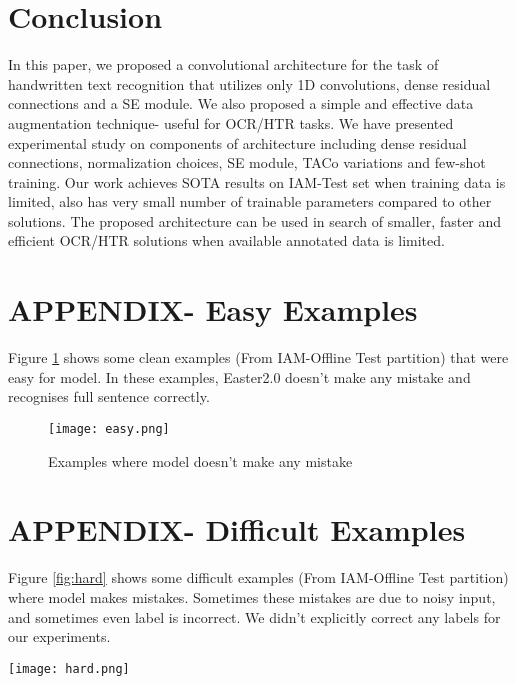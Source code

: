 \documentclass{article}
\begin{document}
\section{Conclusion}
In this paper, we proposed a convolutional architecture for the task of handwritten text recognition that utilizes only 1D convolutions, dense residual connections and a SE module. We also proposed a simple and effective data augmentation technique- useful for OCR/HTR tasks. We have presented experimental study on components of  architecture including dense residual connections, normalization choices, SE module, TACo variations and few-shot training. Our work achieves SOTA results on IAM-Test set when training data is limited, also  has very small number of trainable parameters compared to other solutions. The proposed architecture can be used in search of smaller, faster and efficient OCR/HTR solutions when available annotated data is limited.
\label{sec:headings_3}


  
  

\newpage
\appendix
\onecolumn

\section{APPENDIX- Easy Examples}
Figure \ref{fig:easy} shows some clean examples (From IAM-Offline Test partition) that were easy for model. In these examples, Easter2.0 doesn't make any mistake and recognises full sentence correctly.
\begin{figure}[h]
  \centering
  \texttt{[image: easy.png]}
  \caption{Examples where model doesn't make any mistake}
  \label{fig:easy}
\end{figure}

\newpage

\section{APPENDIX- Difficult Examples}
Figure \ref{fig:hard} shows some difficult examples (From IAM-Offline Test partition) where model makes mistakes. Sometimes these mistakes are due to noisy input, and sometimes even label is incorrect. We didn't explicitly correct any labels for our experiments. 

\begin{figure*}[t]
  \centering
  \texttt{[image: hard.png]}
  \caption{Examples where model makes mistakes}
  \label{fig:hard}
\end{figure*}
\end{document}
